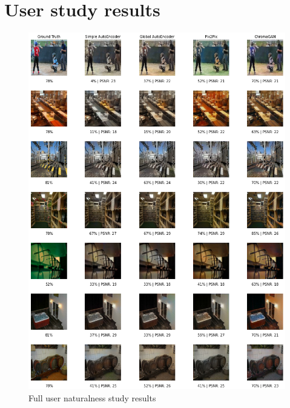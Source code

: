\section*{User study results}
\begin{figure}[H]
    \centering
    \includegraphics[width=1\columnwidth]{sections/appendix/study_result_part1.png}
    \caption{Full user naturalness study results}
    \label{fig:my_label}
\end{figure}

